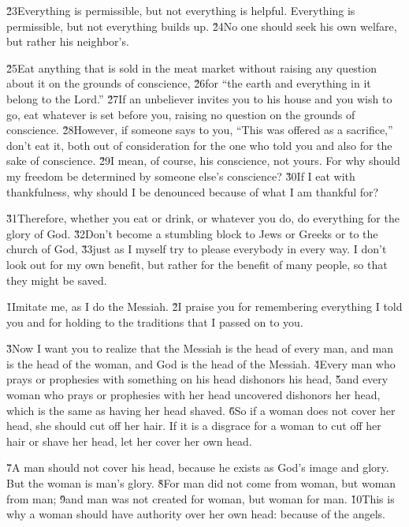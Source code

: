 \v{23}Everything is permissible, but not everything is helpful. Everything is permissible, but not everything builds up. \v{24}No one should seek his own welfare, but rather his neighbor's.

\v{25}Eat anything that is sold in the meat market without raising any question about it on the grounds of conscience, \v{26}for ``the earth and everything in it belong to the Lord.'' \v{27}If an unbeliever invites you to his house and you wish to go, eat whatever is set before you, raising no question on the grounds of conscience. \v{28}However, if someone says to you, ``This was offered as a sacrifice,'' don't eat it, both out of consideration for the one who told you and also for the sake of conscience. \v{29}I mean, of course, his conscience, not yours. For why should my freedom be determined by someone else's conscience? \v{30}If I eat with thankfulness, why should I be denounced because of what I am thankful for?

\v{31}Therefore, whether you eat or drink, or whatever you do, do everything for the glory of God. \v{32}Don't become a stumbling block to Jews or Greeks or to the church of God, \v{33}just as I myself try to please everybody in every way. I don't look out for my own benefit, but rather for the benefit of many people, so that they might be saved.

\v{1}Imitate me, as I do the Messiah. \v{2}I praise you for remembering everything I told you and for holding to the traditions that I passed on to you.

\v{3}Now I want you to realize that the Messiah is the head of every man, and man is the head of the woman, and God is the head of the Messiah. \v{4}Every man who prays or prophesies with something on his head dishonors his head, \v{5}and every woman who prays or prophesies with her head uncovered dishonors her head, which is the same as having her head shaved. \v{6}So if a woman does not cover her head, she should cut off her hair. If it is a disgrace for a woman to cut off her hair or shave her head, let her cover her own head.

\v{7}A man should not cover his head, because he exists as God's image and glory. But the woman is man's glory. \v{8}For man did not come from woman, but woman from man; \v{9}and man was not created for woman, but woman for man. \v{10}This is why a woman should have authority over her own head: because of the angels.

